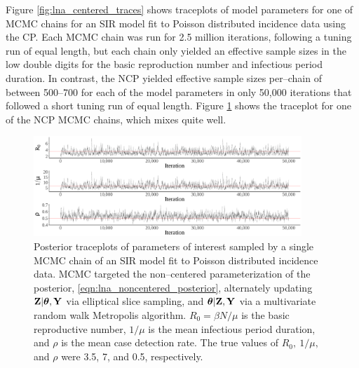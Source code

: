 Figure \ref{fig:lna_centered_traces} shows traceplots of model parameters for one of MCMC chains for an SIR model fit to Poisson distributed incidence data using the CP. Each MCMC chain was run for 2.5 million iterations, following a tuning run of equal length, but each chain only yielded an effective sample sizes in the low double digits for the basic reproduction number and infectious period duration. In contrast, the NCP yielded effective sample sizes per--chain of between 500--700 for each of the model parameters in only 50,000 iterations that followed a short tuning run of equal length. Figure \ref{fig:lna_noncentered_traces} shows the traceplot for one of the NCP MCMC chains, which mixes quite well. 

\begin{figure}[htbp]
	\centering
	\includegraphics[width=0.9\textwidth]{figures/lna_noncentered_traces}
	\caption[Traceplots for an MCMC chain using a non--centered LNA parameterization.]{Posterior traceplots of parameters of interest sampled by a single MCMC chain of an SIR model fit to Poisson distributed incidence data. MCMC targeted the non--centered parameterization of the posterior, \ref{eqn:lna_noncentered_posterior}, alternately updating $ \mathbf{Z}|\boldsymbol{\theta},\mathbf{Y} $ via elliptical slice sampling, and $ \boldsymbol{\theta}|\mathbf{Z},\mathbf{Y} $ via a multivariate random walk Metropolis algorithm. $ R_0 = \beta N / \mu$ is the basic reproductive number, $ 1/\mu $ is the mean infectious period duration, and $ \rho $ is the mean case detection rate. The true values of $ R_0,\ 1/\mu,$ and $ \rho $ were 3.5, 7, and 0.5, respectively.}
	\label{fig:lna_noncentered_traces}
\end{figure}

